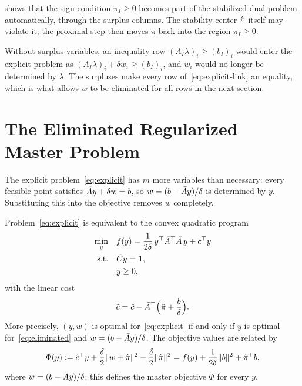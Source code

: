 \begin{remark} \label{rem:sign-in-dual}
 shows that the sign condition $\pi_I\ge0$ becomes part of the
stabilized dual problem automatically, through the surplus columns. The stability center
$\hat{\pi}$ itself may violate it; the proximal step then moves $\pi$ back into the region
$\pi_I\ge0$.
\end{remark}

\begin{remark} \label{rem:why-surplus}
Without surplus variables, an inequality row $(A_I\lambda)_i\ge(b_I)_i$ would enter the
explicit problem as $(A_I\lambda)_i + \delta w_i\ge(b_I)_i$, and $w_i$ would no longer be
determined by $\lambda$. The surpluses make every row of~\eqref{eq:explicit-link} an
equality, which is what allows $w$ to be eliminated for all rows in the next section.
\end{remark}


\section{The Eliminated Regularized Master Problem}
\label{sec:eliminated}

The explicit problem~\eqref{eq:explicit} has $m$ more variables than necessary: every
feasible point satisfies $\bar{A} y + \delta w = b$, so $w = (b - \bar{A} y)/\delta$ is determined
by $y$. Substituting this into the objective removes $w$ completely.

\begin{theorem} \label{thm:eliminated}
Problem~\eqref{eq:explicit} is equivalent to the convex quadratic program
\begin{subequations} \label{eq:eliminated}
\begin{align}
\min_{y}\quad & f(y) = \frac{1}{2\delta}\, y^\top\bar{A}^\top\bar{A}\, y + \tilde{c}^\top y \\
\text{s.t.}\quad & \bar{C} y = \mathbf{1}, \label{eq:eliminated-conv}\\
& y\ge0, \label{eq:eliminated-bounds}
\end{align}
\end{subequations}
with the linear cost
\begin{equation} \label{eq:ctilde}
\tilde{c} = \hat{c} - \bar{A}^\top\Bigl(\hat{\pi} + \frac{b}{\delta}\Bigr).
\end{equation}
More precisely, $(y, w)$ is optimal for~\eqref{eq:explicit} if and only if $y$ is optimal
for~\eqref{eq:eliminated} and $w = (b - \bar{A} y)/\delta$. The objective values are related by
\begin{equation} \label{eq:objective-relation}
\Phi(y) := \hat{c}^\top y + \frac{\delta}{2}\lVert w+\hat{\pi}\rVert^2 - \frac{\delta}{2}\lVert\hat{\pi}\rVert^2
= f(y) + \frac{1}{2\delta}\lVert b\rVert^2 + \hat{\pi}^\top b,
\end{equation}
where $w = (b - \bar{A} y)/\delta$; this defines the master objective $\Phi$ for every $y$.
\end{theorem}


